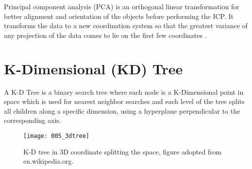 \documentclass[../structure.tex]{subfiles}
\begin{document}
Principal component analysis (PCA) is an orthogonal linear transformation for better alignment and orientation of the objects before performing the ICP.  It transforms the data to a new coordination system so that the greatest variance of any projection of the data comes to lie on the first few coordinates \cite{Jolliffe2002}.


\section{K-Dimensional (KD) Tree}

A K-D Tree is a binary search tree where each node is a K-Dimensional point in space which is used for nearest neighbor searches and each level of the tree splits all children along a specific dimension, using a hyperplane perpendicular to the corresponding axis.

\begin{figure}[h!]
	\centering
	\texttt{[image: 005\_3dtree]}
	\captionsetup{justification=centering}
	\caption{K-D tree in 3D coordinate splitting the space, figure adopted from en.wikipedia.org.}
	\label{fig:k_d_tree}
\end{figure}
\end{document}

